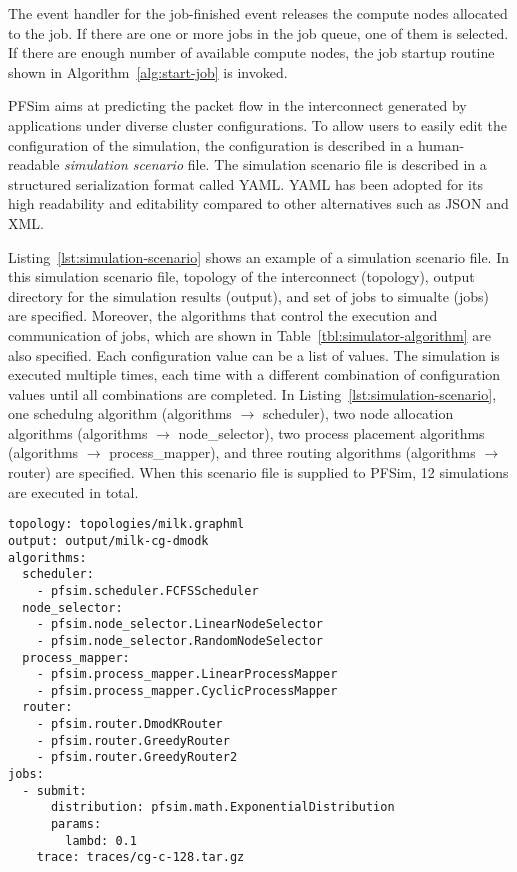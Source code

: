 The event handler for the job-finished event releases the compute nodes
allocated to the job. If there are one or more jobs in the job queue, one of
them is selected. If there are enough number of available compute nodes, the
job startup routine shown in Algorithm~\ref{alg:start-job} is invoked.

PFSim aims at predicting the packet flow in the interconnect generated by
applications under diverse cluster configurations. To allow users to easily
edit the configuration of the simulation, the configuration is described in a
human-readable \emph{simulation scenario} file. The simulation scenario file
is described in a structured serialization format called YAML\@. YAML has been
adopted for its high readability and editability compared to other
alternatives such as JSON and XML\@.

Listing~\ref{lst:simulation-scenario} shows an example of a simulation
scenario file. In this simulation scenario file, topology of the interconnect
(topology), output directory for the simulation results (output), and set of
jobs to simualte (jobs) are specified. Moreover, the algorithms that control
the execution and communication of jobs, which are shown in
Table~\ref{tbl:simulator-algorithm} are also specified. Each configuration
value can be a list of values. The simulation is executed multiple times, each
time with a different combination of configuration values until all
combinations are completed. In Listing~\ref{lst:simulation-scenario}, one
schedulng algorithm (algorithms $\to$ scheduler), two node allocation
algorithms (algorithms $\to$ node\_selector), two process placement algorithms
(algorithms $\to$ process\_mapper), and three routing algorithms (algorithms
$\to$ router) are specified. When this scenario file is supplied to PFSim, 12
simulations are executed in total.

\begin{lstlisting}[caption={Example of a Simulation Scenario},%
                   label={lst:simulation-scenario}, linewidth={\columnwidth},%
                   float={htbp}]
topology: topologies/milk.graphml
output: output/milk-cg-dmodk
algorithms:
  scheduler:
    - pfsim.scheduler.FCFSScheduler
  node_selector:
    - pfsim.node_selector.LinearNodeSelector
    - pfsim.node_selector.RandomNodeSelector
  process_mapper:
    - pfsim.process_mapper.LinearProcessMapper
    - pfsim.process_mapper.CyclicProcessMapper
  router:
    - pfsim.router.DmodKRouter
    - pfsim.router.GreedyRouter
    - pfsim.router.GreedyRouter2
jobs:
  - submit:
      distribution: pfsim.math.ExponentialDistribution
      params:
        lambd: 0.1
    trace: traces/cg-c-128.tar.gz
\end{lstlisting}

